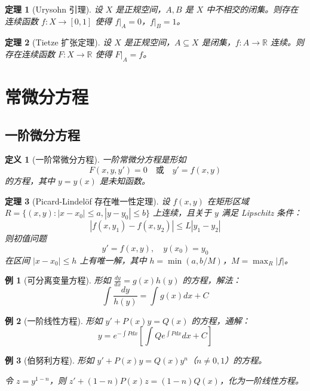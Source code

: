 \documentclass[12pt]{article}
\newtheorem{theorem}{定理}[section]
\newtheorem{definition}{定义}[section]
\newtheorem{example}{例}[section]
\begin{document}
\begin{theorem}[Urysohn 引理]
设 $X$ 是正规空间，$A, B$ 是 $X$ 中不相交的闭集。则存在连续函数 $f: X \to [0, 1]$ 使得 $f|_A = 0$，$f|_B = 1$。
\end{theorem}

\begin{theorem}[Tietze 扩张定理]
设 $X$ 是正规空间，$A \subseteq X$ 是闭集，$f: A \to \mathbb{R}$ 连续。则存在连续函数 $F: X \to \mathbb{R}$ 使得 $F|_A = f$。
\end{theorem}


\section{常微分方程}

\subsection{一阶微分方程}

\begin{definition}[一阶常微分方程]
一阶常微分方程是形如
$$F(x, y, y') = 0 \quad \text{或} \quad y' = f(x, y)$$
的方程，其中 $y = y(x)$ 是未知函数。
\end{definition}

\begin{theorem}[Picard-Lindelöf 存在唯一性定理]
设 $f(x, y)$ 在矩形区域 $R = \{(x, y) : |x - x_0| \leq a, |y - y_0| \leq b\}$ 上连续，且关于 $y$ 满足 Lipschitz 条件：
$$|f(x, y_1) - f(x, y_2)| \leq L|y_1 - y_2|$$
则初值问题
$$y' = f(x, y), \quad y(x_0) = y_0$$
在区间 $|x - x_0| \leq h$ 上有唯一解，其中 $h = \min(a, b/M)$，$M = \max_{R} |f|$。
\end{theorem}

\begin{example}[可分离变量方程]
形如 $\frac{dy}{dx} = g(x)h(y)$ 的方程，解法：
$$\int \frac{dy}{h(y)} = \int g(x) dx + C$$
\end{example}

\begin{example}[一阶线性方程]
形如 $y' + P(x)y = Q(x)$ 的方程，通解：
$$y = e^{-\int P dx}\left[\int Q e^{\int P dx} dx + C\right]$$
\end{example}

\begin{example}[伯努利方程]
形如 $y' + P(x)y = Q(x)y^n$（$n \neq 0, 1$）的方程。

令 $z = y^{1-n}$，则 $z' + (1-n)P(x)z = (1-n)Q(x)$，化为一阶线性方程。
\end{example}
\end{document}
